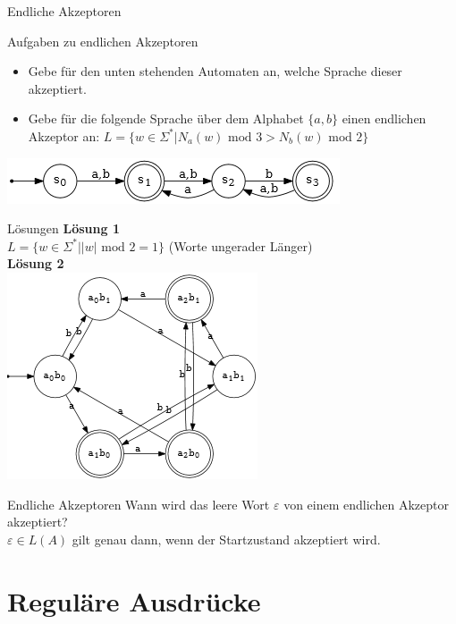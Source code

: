 \begin{frame}{Endliche Akzeptoren}
	\begin{taskblock}{Aufgaben zu endlichen Akzeptoren}
		\begin{itemize}
			\item Gebe für den unten stehenden Automaten an, welche Sprache dieser akzeptiert.
			\item Gebe für die folgende Sprache über dem Alphabet $\{a,b\}$ einen endlichen Akzeptor an:
			$L = \{w \in \Sigma^* | N_a(w) \text{ mod } 3 > N_b(w) \text{ mod } 2\}$
		\end{itemize}
	\end{taskblock}

	\includegraphics[scale=0.7]{images/AufgAkzeptor1.png}
\end{frame}

\begin{frame}{Lösungen}	
	\textbf{Lösung 1}\\
	$L = \{w \in \Sigma^* | |w| \text{ mod } 2 = 1\}$ (Worte ungerader Länger)\\
	\pause
	\textbf{Lösung 2}\\
	\includegraphics[scale=0.8]{images/LoesAkzeptor.png}
\end{frame}

\begin{frame}{Endliche Akzeptoren}
	Wann wird das leere Wort $\varepsilon$ von einem endlichen Akzeptor akzeptiert?\\
	\pause
	$\varepsilon \in L(A)$ gilt genau dann, wenn der Startzustand akzeptiert wird.
\end{frame}
\section{Reguläre Ausdrücke}

